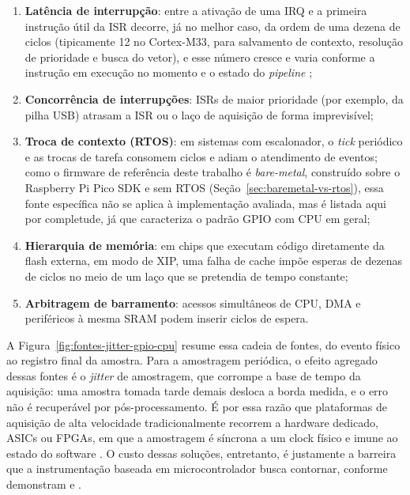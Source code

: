 \begin{enumerate}
  \item \textbf{Latência de interrupção}: entre a ativação de uma \ac{IRQ} e a primeira instrução útil da \ac{ISR} decorre, já no melhor caso, da ordem de uma dezena de ciclos (tipicamente 12 no Cortex-M33, para salvamento de contexto, resolução de prioridade e busca do vetor), e esse número cresce e varia conforme a instrução em execução no momento e o estado do \emph{pipeline} \cite{arm2021};
  \item \textbf{Concorrência de interrupções}: \acp{ISR} de maior prioridade (por exemplo, da pilha \ac{USB}) atrasam a \ac{ISR} ou o laço de aquisição de forma imprevisível;
  \item \textbf{Troca de contexto (\acs{RTOS})}: em sistemas com escalonador, o \emph{tick} periódico e as trocas de tarefa consomem ciclos e adiam o atendimento de eventos; como o firmware de referência deste trabalho é \emph{bare-metal}, construído sobre o Raspberry Pi Pico \ac{SDK} e sem \ac{RTOS} (Seção~\ref{sec:baremetal-vs-rtos}), essa fonte específica não se aplica à implementação avaliada, mas é listada aqui por completude, já que caracteriza o padrão \ac{GPIO} com \ac{CPU} em geral;
  \item \textbf{Hierarquia de memória}: em chips que executam código diretamente da flash externa, em modo de \ac{XIP}, uma falha de cache impõe esperas de dezenas de ciclos no meio de um laço que se pretendia de tempo constante;
  \item \textbf{Arbitragem de barramento}: acessos simultâneos de \ac{CPU}, \ac{DMA} e periféricos à mesma \ac{SRAM} podem inserir ciclos de espera.
\end{enumerate}

A Figura~\ref{fig:fontes-jitter-gpio-cpu} resume essa cadeia de fontes, do
evento físico ao registro final da amostra. Para a amostragem periódica, o
efeito agregado dessas fontes é o \emph{jitter} de amostragem, que corrompe a
base de tempo da aquisição: uma amostra tomada tarde demais desloca a borda
medida, e o erro não é recuperável por pós-processamento. É por essa razão que
plataformas de aquisição de alta velocidade tradicionalmente recorrem a
hardware dedicado, \acp{ASIC} ou \acp{FPGA}, em que a amostragem é síncrona a
um clock físico e imune ao estado do software \cite{dai2017,gis2021}. O custo
dessas soluções, entretanto, é justamente a barreira que a instrumentação
baseada em microcontrolador busca contornar, conforme demonstram
 e .

